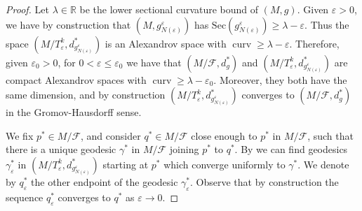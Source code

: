 \documentclass[12pt,a4paper,reqno]{amsart}
\theoremstyle{definition}
\numberwithin{equation}{section}
\newcommand{\fol}{\mathcal{F}}
\newcommand{\R}{\mathbb{R}} %
\newcommand{\Sec}{\mathrm{Sec}}
\DeclareMathOperator{\curv}{curv}
\begin{document}
\begin{proof}
Let $\lambda\in \R$ be  the lower sectional curvature bound of $(M,g)$. Given $\varepsilon>0$, we have by construction that $(M, g^\varepsilon_{N(\varepsilon)})$ has $\Sec(g^\varepsilon_{N(\varepsilon)})\geq  \lambda-\varepsilon$. Thus the space $(M/T^k_\varepsilon,d^\ast_{g^\varepsilon_{N(\varepsilon)}})$ is an Alexandrov space with $\curv\geq \lambda-\varepsilon$. Therefore, given $\varepsilon_0>0$, for  $0<\varepsilon\leq\varepsilon_0$ we have that $(M/\fol,d_g^\ast)$ and $(M/T^k_\varepsilon, d^\ast_{g^\varepsilon_{N(\varepsilon)}})$ are compact Alexandrov spaces with $\curv\geq \lambda-\varepsilon_0$. Moreover, they both have the same dimension, and by construction $(M/T^k_\varepsilon, d^\ast_{g^\varepsilon_{N(\varepsilon)}})$ converges to $(M/\fol,d^\ast_g)$ in the Gromov-Hausdorff sense.  

We fix $p^\ast\in M/\fol$, and consider $q^\ast\in M/\fol$ close enough to $p^\ast$ in $M/\fol$, such that there is a unique geodesic $\gamma^\ast$ in $M/\fol$ joining $p^\ast$ to $q^\ast$. By \cite[Lemma 2.2]{GrovePetersen1991} we can find geodesics $\gamma^\ast_\varepsilon$ in $(M/T^k_\varepsilon,d^\ast_{g^\varepsilon_{N(\varepsilon)}})$ starting at $p^\ast$ which converge uniformly to $\gamma^\ast$. We denote by $q_\varepsilon^\ast$ the other endpoint of the geodesic $\gamma^\ast_\varepsilon$. Observe that by construction the sequence $q_\varepsilon^\ast$ converges to $q^\ast$ as $\varepsilon\to 0$. 


\end{proof}
\end{document}
